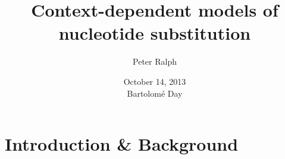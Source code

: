 \documentclass[smaller]{beamer}
\title[Context-dependent models] %
{Context-dependent models of nucleotide substitution}
\author %
{Peter Ralph}
\institute[USC]
{
  USC -- Computational Biology and Bioinformatics
  }
\date %
{October 14, 2013\\ \small Bartolom\'e Day}
\begin{document}

\begin{frame}
  \titlepage
\end{frame}


%
%
%


\section{Introduction \& Background}
\end{document}
